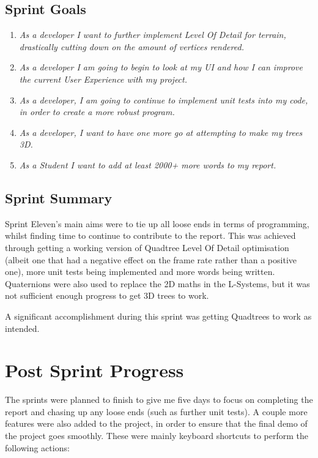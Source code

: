 \documentclass[a4paper,10pt]{report}
\begin{document}
\subsection{Sprint Goals}
\begin{enumerate}
    \item\textit{ As a developer I want to further implement Level Of Detail for terrain, drastically cutting down on the amount of vertices rendered.}

\item\textit{ As a developer I am going to begin to look at my UI and how I can improve the current User Experience with my project.}

\item\textit{ As a developer, I am going to continue to implement unit tests into my code, in order to create a more robust program. }

\item\textit{ As a developer, I want to have one more go at attempting to make my trees 3D. }

\item\textit{ As a Student I want to add at least 2000+ more words to my report.}

\end{enumerate}

\subsection{Sprint Summary}
Sprint Eleven's main aims were to tie up all loose ends in terms of programming, whilst finding time to continue to contribute to the report. This was achieved through getting a working version of Quadtree Level Of Detail optimisation (albeit one that had a negative effect on the frame rate rather than a positive one), more unit tests being implemented and more words being written. Quaternions were also used to replace the 2D maths in the L-Systems, but it was not sufficient enough progress to get 3D trees to work. \medskip

A significant accomplishment during this sprint was getting Quadtrees to work as intended.

\clearpage
\section{Post Sprint Progress}
The sprints were planned to finish to give me five days to focus on completing the report and chasing up any loose ends (such as further unit tests). A couple more features were also added to the project, in order to ensure that the final demo of the project goes smoothly. These were mainly keyboard shortcuts to perform the following actions:
\end{document}
